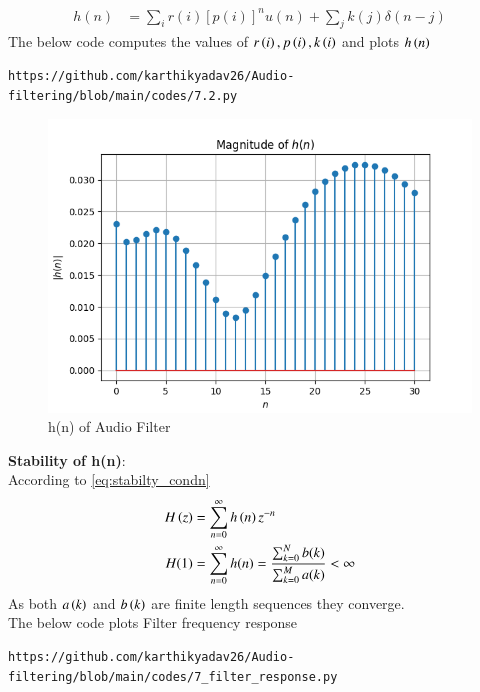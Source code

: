 \documentclass[journal,12pt,twocolumn]{IEEEtran}
\theoremstyle{remark}
\renewcommand\thesection{\arabic{section}}
\begin{document}
\begin{enumerate}[label=\thesection.\arabic*]
\begin{align}
h(n) &= \sum_{i}r(i)[p(i)]^nu(n) + \sum_{j}k(j)\delta(n - j)
	\label{eq:h-n-expr}
\end{align}
The below code computes the values of $r\left(i\right),p\left(i\right) , k\left(i\right)$ and plots $h\left(n\right)$
\begin{lstlisting}
https://github.com/karthikyadav26/Audio-filtering/blob/main/codes/7.2.py
\end{lstlisting}

\begin{figure}[htbp]
\centering
\includegraphics[width=\columnwidth]{figs/h(n) of Audio Filter.png}
\caption{h(n) of Audio Filter}
\label{fig:6.2_hn}
\end{figure}
\textbf{Stability of h(n)}:\\
According to \eqref{eq:stabilty_condn}
\begin{align}
H\left(z\right) &= \sum_{n = 0}^{\infty} h\left(n\right)z^{-n}\\
H(1)&= \sum_{n = 0}^{\infty}h(n)  = \frac{\sum_{k = 0}^{N}b(k)}{\sum_{k = 0}^{M}a(k)}< \infty
\end{align}
As both $a\left(k\right)$ and $b\left(k\right)$ are finite length sequences they converge.\\
The below code plots Filter frequency response
\begin{lstlisting}
https://github.com/karthikyadav26/Audio-filtering/blob/main/codes/7_filter_response.py
\end{lstlisting}
\begin{figure}[htbp]
\centering

\end{figure}
\end{enumerate}
\end{document}
